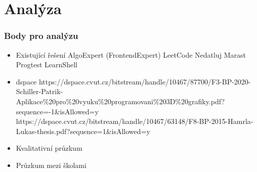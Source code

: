 
\chapter{Analýza}

\subsection{Body pro analýzu}
\begin{itemize}
    \item Existující řešení
    \subitem AlgoExpert (FrontendExpert)
    \subitem LeetCode
    \subitem Nedatluj %
    \subitem Marast
    \subitem Progtest
    \subitem LearnShell %
    \item dspace
    \subitem https://dspace.cvut.cz/bitstream/handle/10467/87700/F3-BP-2020-Schiller-Patrik-Aplikace\%20pro\%20vyuku\%20programovani\%203D\%20grafiky.pdf?sequence=-1\&isAllowed=y
    \subitem https://dspace.cvut.cz/bitstream/handle/10467/63148/F8-BP-2015-Hamrla-Lukas-thesis.pdf?sequence=1\&isAllowed=y
    \item Kvalitativní průzkum
    \item Průzkum mezi školami
\end{itemize}
